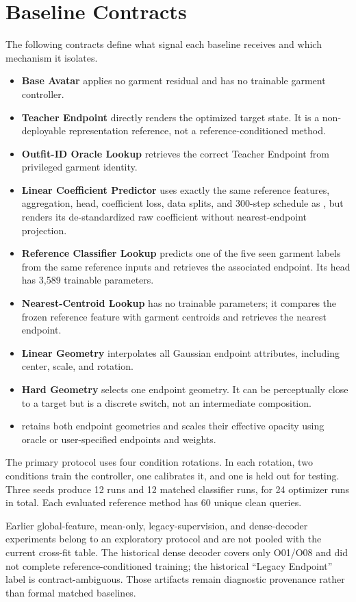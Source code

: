 \section{Baseline Contracts}
\label{sec:supp_baselines}

The following contracts define what signal each baseline receives and which mechanism it isolates.
\begin{itemize}
    \item \textbf{Base Avatar} applies no garment residual and has no trainable garment controller.
    \item \textbf{Teacher Endpoint} directly renders the optimized target state. It is a non-deployable representation reference, not a reference-conditioned method.
    \item \textbf{Outfit-ID Oracle Lookup} retrieves the correct Teacher Endpoint from privileged garment identity.
    \item \textbf{Linear Coefficient Predictor} uses exactly the same reference features, aggregation, head, coefficient loss, data splits, and 300-step schedule as \method{}, but renders its de-standardized raw coefficient without nearest-endpoint projection.
    \item \textbf{Reference Classifier Lookup} predicts one of the five seen garment labels from the same reference inputs and retrieves the associated endpoint. Its head has 3,589 trainable parameters.
    \item \textbf{Nearest-Centroid Lookup} has no trainable parameters; it compares the frozen reference feature with garment centroids and retrieves the nearest endpoint.
    \item \textbf{Linear Geometry} interpolates all Gaussian endpoint attributes, including center, scale, and rotation.
    \item \textbf{Hard Geometry} selects one endpoint geometry. It can be perceptually close to a target but is a discrete switch, not an intermediate composition.
    \item \textbf{\dual{}} retains both endpoint geometries and scales their effective opacity using oracle or user-specified endpoints and weights.
\end{itemize}

The primary protocol uses four condition rotations. In each rotation, two conditions train the controller, one calibrates it, and one is held out for testing. Three seeds produce 12 \method{} runs and 12 matched classifier runs, for 24 optimizer runs in total. Each evaluated reference method has 60 unique clean queries.

Earlier global-feature, mean-only, legacy-supervision, and dense-decoder experiments belong to an exploratory protocol and are not pooled with the current cross-fit table. The historical dense decoder covers only O01/O08 and did not complete reference-conditioned training; the historical ``Legacy Endpoint'' label is contract-ambiguous. Those artifacts remain diagnostic provenance rather than formal matched baselines.

